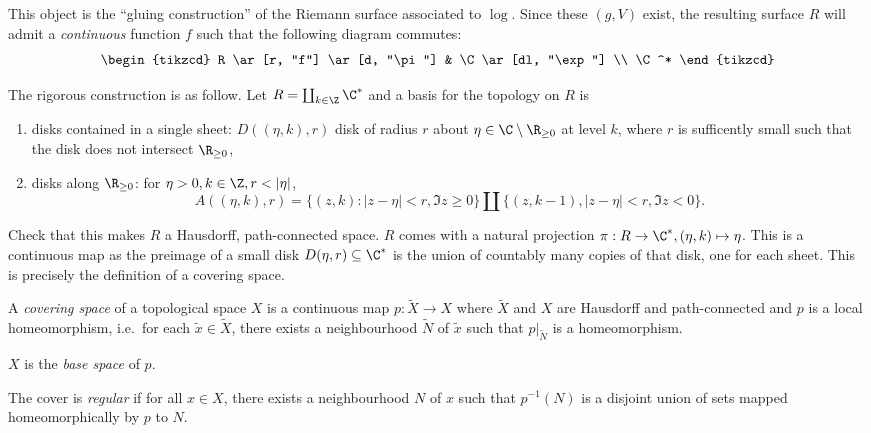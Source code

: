 \documentclass[a4paper]{article}
\begin{document}
\begin{eg}
  This object is the ``gluing construction'' of the Riemann surface associated to \(\log\). Since these \((g, V)\) exist, the resulting surface \(R\) will admit a \emph{continuous} function \(f\) such that the following diagram commutes:
  \[
    \begin{tikzcd}
      R \ar[r, "f"] \ar[d, "\pi"] & \C \ar[dl, "\exp"] \\
      \C^*
    \end{tikzcd}
  \]

  The rigorous construction is as follow. Let \(R = \coprod _{k \in \Z} \C^*\) and a basis for the topology on \(R\) is
  \begin{enumerate}
  \item disks contained in a single sheet: \(D((\eta, k), r)\) disk of radius \(r\) about \(\eta \in \C \setminus \R_{\geq 0}\) at level \(k\), where \(r\) is sufficently small such that the disk does not intersect \(\R_{\geq 0}\),
  \item disks along \(\R_{\geq 0}\): for \(\eta > 0, k \in \Z, r < |\eta|\),
    \[
      A((\eta, k), r) = \{(z, k): |z - \eta| < r, \Im z \geq 0\} \amalg \{(z, k - 1), |z - \eta| < r, \Im z < 0\}.
    \]
  \end{enumerate}

Check that this makes \(R\) a Hausdorff, path-connected space. \(R\) comes with a natural projection \(\pi: R \to \C^*, (\eta, k) \mapsto \eta\). This is a continuous map as the preimage of a small disk \(D(\eta, r) \subseteq \C^*\) is the union of countably many copies of that disk, one for each sheet. This is precisely the definition of a covering space.
\end{eg}

\begin{definition}
  A \emph{covering space} of a topological space \(X\) is a continuous map \(p: \tilde X \to X\) where \(\tilde X\) and \(X\) are Hausdorff and path-connected and \(p\) is a local homeomorphism, i.e.\ for each \(\tilde x \in \tilde X\), there exists a neighbourhood \(\tilde N\) of \(\tilde x\) such that \(p|_{\tilde N}\) is a homeomorphism.

    \(X\) is the \emph{base space} of \(p\).

    The cover is \emph{regular} if for all \(x \in X\), there exists a neighbourhood \(N\) of \(x\) such that \(p^{-1}(N)\) is a disjoint union of sets mapped homeomorphically by \(p\) to \(N\).
\end{definition}
\end{document}
